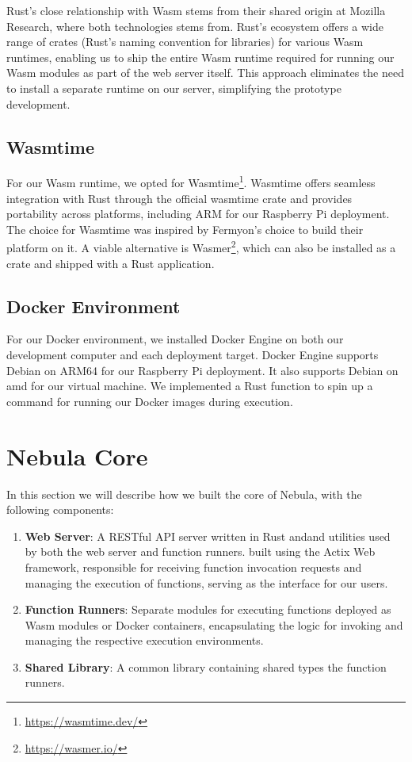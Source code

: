 \documentclass[
  table]{report}
\begin{document}
Rust's close relationship with \ac{Wasm} stems from their shared origin
at Mozilla Research, where both technologies stems from. Rust's
ecosystem offers a wide range of crates (Rust's naming convention for
libraries) for various \ac{Wasm} runtimes, enabling us to ship the
entire Wasm runtime required for running our Wasm modules as part of the
web server itself. This approach eliminates the need to install a
separate runtime on our server, simplifying the prototype development.

\subsection{Wasmtime}

For our \ac{Wasm} runtime, we opted for Wasmtime\footnote{\url{https://wasmtime.dev/}}.
Wasmtime offers seamless integration with Rust through the official
wasmtime crate and provides portability across platforms, including ARM
for our Raspberry Pi deployment. The choice for Wasmtime was inspired by
Fermyon's choice to build their platform on it. A viable alternative is
Wasmer\footnote{\url{https://wasmer.io/}}, which can also be installed
as a crate and shipped with a Rust application.

\subsection{Docker Environment}

For our Docker environment, we installed Docker Engine on both our
development computer and each deployment target. Docker Engine supports
Debian on ARM64 for our Raspberry Pi deployment. It also supports Debian
on amd for our virtual machine. We implemented a Rust function to spin
up a command for running our Docker images during execution.

\section{Nebula Core}

In this section we will describe how we built the core of Nebula, with
the following components:

\begin{enumerate}
\def\labelenumi{\arabic{enumi}.}
\item
  \textbf{Web Server}: A RESTful API server written in Rust andand
  utilities used by both the web server and function runners. built
  using the Actix Web framework, responsible for receiving function
  invocation requests and managing the execution of functions, serving
  as the interface for our users.
\item
  \textbf{Function Runners}: Separate modules for executing functions
  deployed as Wasm modules or Docker containers, encapsulating the logic
  for invoking and managing the respective execution environments.
\item
  \textbf{Shared Library}: A common library containing shared types the
  function runners.
\end{enumerate}
\end{document}
